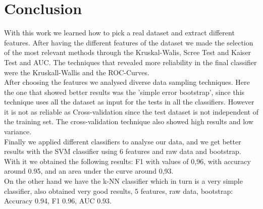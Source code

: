\documentclass[english, a4paper, 12pt]{article}
\newcommand{\tab}{\hspace*{2em}}
\begin{document}
\section{Conclusion}
\tab With this work we learned how to pick a real dataset and extract different features. After having the different features of the dataset we made the selection of the most relevant methods through the Kruskal-Walis, Scree Test and Kaiser Test and AUC. The techniques that revealed more reliability in the final classifier were the Kruskall-Wallis and the ROC-Curves.\\
\tab After choosing the features we analysed diverse data sampling techniques. Here the one that showed better results was the 'simple error bootstrap', since this technique uses all the dataset as input for the tests in all the classifiers. However it is not as reliable as Cross-validation since the test dataset is not independent of the training set. The cross-validation technique also showed high results and low variance.\\
\tab Finally we applied different classifiers to analyse our data, and we get better results with the SVM classifier using 6 features and raw data and bootstrap. With it we obtained the following results: F1 with values of 0,96, with accuracy around 0.95, and an area under the curve around 0,93.\\
\tab On the other hand we have the k-NN classifier which in turn is a very simple classifier, also obtained very good results, 5 features, raw data, bootstrap: Accuracy 0.94, F1 0.96, AUC 0.93.

\end{document}

